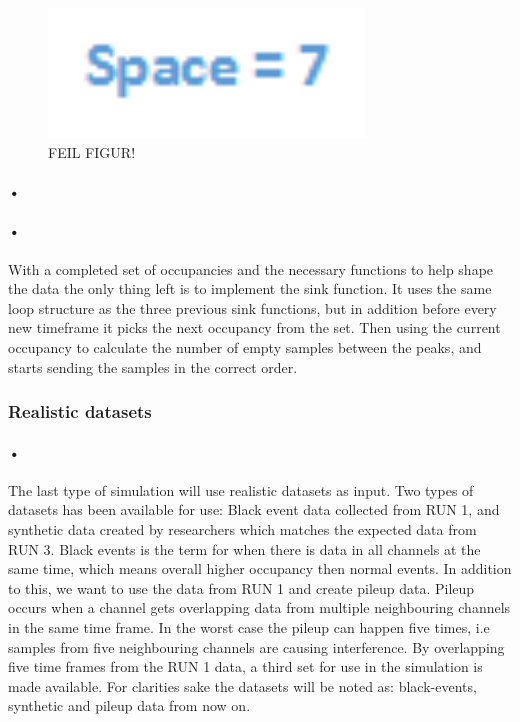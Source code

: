\documentclass[a4paper, 12pt]{report}
\begin{document}
\begin{figure}[h!]
	\centering
		\includegraphics[width=0.75\textwidth]{images/normal-data-shape.png}
		\caption{FEIL FIGUR!}
		\label{fig:normal-data-shape}
\end{figure}

\paragraph{•}
\begin{minipage}{\linewidth}

\end{minipage}

\paragraph{•}
With a completed set of occupancies and the necessary functions to help shape the data the only thing left is to implement the sink function.
It uses the same loop structure as the three previous sink functions, but in addition before every new timeframe it picks the next occupancy from the set.
Then using the current occupancy to calculate the number of empty samples between the peaks, and starts sending the samples in the correct order.

\subsubsection{Realistic datasets}
\label{subsubsec:real-data}

\paragraph{•}
The last type of simulation will use realistic datasets as input. 
Two types of datasets has been available for use: Black event data collected from RUN 1, and synthetic data created by researchers which matches the expected data from RUN 3.
Black events is the term for when there is data in all channels at the same time, which means overall higher occupancy then normal events.
In addition to this, we want to use the data from RUN 1 and create pileup data.
Pileup occurs when a channel gets overlapping data from multiple neighbouring channels in the same time frame.
In the worst case the pileup can happen five times, i.e samples from five neighbouring channels are causing interference.
By overlapping five time frames from the RUN 1 data, a third set for use in the simulation is made available.
For clarities sake the datasets will be noted as: black-events, synthetic and pileup data from now on.
 
\end{document}
